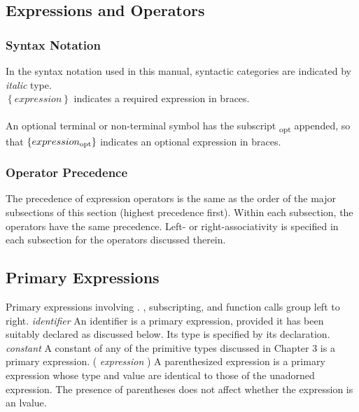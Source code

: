 \begin{homeworkProblem}
	\chapter{Expressions and Operators}
    \subsection{Syntax Notation}
    In the syntax notation used in this manual, syntactic categories are indicated by \textit{italic} type.\\
    \textit{ $\left\{ expression \right\}$ }
    indicates a required expression in braces.
    \\
    \\
    An optional terminal or non-terminal symbol has the subscript \textsubscript{opt} appended, so that
    \textit{ $\left\{ expression\textsubscript{opt}\right\}$ }
    indicates an optional expression in braces.
    
    \subsection{Operator Precedence}
    The precedence of expression operators is the same as the order of the major subsections of this section (highest precedence first). Within each subsection, the operators have the same precedence. Left- or right-associativity is specified in each subsection for the operators discussed therein.
	\section{Primary Expressions}
	Primary expressions involving . , subscripting, and function calls group left to right.
    \newline	
    \newline
    \textit{identifier}
    \newline
    An identifier is a primary expression, provided it has been suitably declared as discussed below. Its type is specified by its declaration.
   \newline
   \newline
	\textit{constant}
    \newline
    A constant of any of the primitive types discussed in Chapter 3 is a primary expression.
    \newline
    \newline
    ( \textit{expression} )
    \newline
    A parenthesized expression is a primary expression whose type and value are identical to those of the unadorned expression. The presence of parentheses does not affect whether the expression is an lvalue.
    

\end{homeworkProblem}
